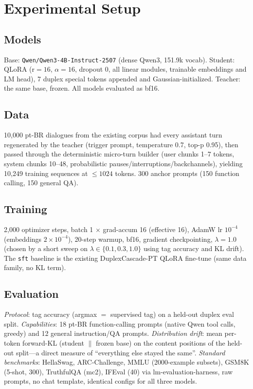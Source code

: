 \documentclass[conference]{IEEEtran}
\begin{document}
\section{Experimental Setup}
\label{sec:setup}
\subsection{Models}
Base: \texttt{Qwen/Qwen3-4B-Instruct-2507} (dense Qwen3, 151.9k vocab). Student:
QLoRA (r$=16$, $\alpha{=}16$, dropout 0, all linear modules, trainable embeddings and
LM head), 7 duplex special tokens appended and Gaussian-initialized. Teacher: the same
base, frozen. All models evaluated as bf16.

\subsection{Data}
10,000 pt-BR dialogues from the existing corpus had every assistant turn regenerated
by the teacher (trigger prompt, temperature 0.7, top-p 0.95), then passed through the
deterministic micro-turn builder (user chunks 1--7 tokens, system chunks 10--48,
probabilistic pauses/interruptions/backchannels), yielding 10,249 training sequences
at ${\le}1024$ tokens. 300 anchor prompts (150 function calling, 150 general QA).

\subsection{Training}
2,000 optimizer steps, batch 1 $\times$ grad-accum 16 (effective 16), AdamW lr
$10^{-4}$ (embeddings $2{\times}10^{-4}$), 20-step warmup, bf16, gradient
checkpointing, $\lambda{=}1.0$ (chosen by a short sweep on $\lambda\in\{0.1,0.3,1.0\}$
using tag accuracy and KL drift). The \texttt{sft} baseline is the existing
DuplexCascade-PT QLoRA fine-tune (same data family, no KL term).

\subsection{Evaluation}
\emph{Protocol}: tag accuracy (argmax $=$ supervised tag) on a held-out duplex eval
split. \emph{Capabilities}: 18 pt-BR function-calling prompts (native Qwen tool
calls, greedy) and 12 general instruction/QA prompts. \emph{Distribution drift}:
mean per-token forward-KL (student $\|$ frozen base) on the content positions of the
held-out split---a direct measure of ``everything else stayed the same''.
\emph{Standard benchmarks}: HellaSwag, ARC-Challenge, MMLU (2000-example subsets),
GSM8K (5-shot, 300), TruthfulQA (mc2), IFEval (40) via lm-evaluation-harness, raw
prompts, no chat template, identical configs for all three models.
\end{document}
